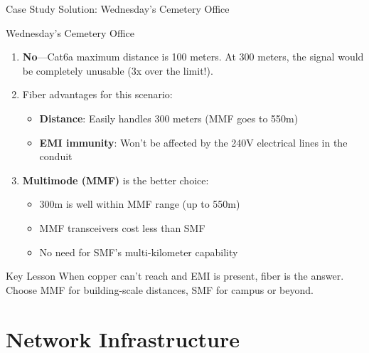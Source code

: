 \documentclass[aspectratio=169]{beamer}  %
\begin{document}
\begin{frame}{Case Study Solution: Wednesday's Cemetery Office}
    \begin{casesolution}{Wednesday's Cemetery Office}
        \begin{enumerate}
            \item \textbf{No}---Cat6a maximum distance is 100 meters. At 300 meters, the signal would be completely unusable (3x over the limit!).
            \item Fiber advantages for this scenario:
                \begin{itemize}
                    \item \textbf{Distance}: Easily handles 300 meters (MMF goes to 550m)
                    \item \textbf{EMI immunity}: Won't be affected by the 240V electrical lines in the conduit
                \end{itemize}
            \item \textbf{Multimode (MMF)} is the better choice:
                \begin{itemize}
                    \item 300m is well within MMF range (up to 550m)
                    \item MMF transceivers cost less than SMF
                    \item No need for SMF's multi-kilometer capability
                \end{itemize}
        \end{enumerate}
    \end{casesolution}
    
    \begin{alertblock}{Key Lesson}
        When copper can't reach and EMI is present, fiber is the answer. Choose MMF for building-scale distances, SMF for campus or beyond.
    \end{alertblock}
\end{frame}

\section{Network Infrastructure}
\end{document}
